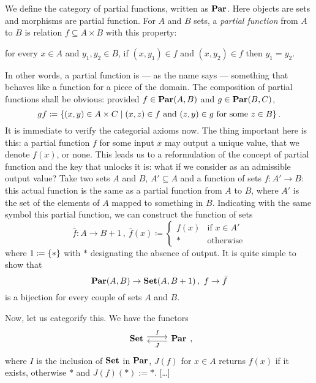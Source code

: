 \begin{example}
We define the category of partial functions, written as \(\mathbf{Par}\). Here objects are sets and morphisms are partial function. For \(A\) and \(B\) sets, a {\em partial function} from \(A\) to \(B\) is relation \(f \subseteq A \times B\) with this property:
\begin{center}
for every \(x \in A\) and \(y_1, y_2 \in B\), if \((x, y_1) \in f\) and \((x, y_2) \in f\) then \(y_1 = y_2\).
\end{center}
In other words, a partial function is --- as the name says --- something that behaves like a function for a piece of the domain. The composition of partial functions shall be obvious: provided \(f \in \mathbf{Par}(A, B)\) and \(g \in \mathbf{Par}(B, C)\),
\[gf \coloneq \left\{(x, y) \in A \times C \mid (x, z) \in f \text{ and } (z, y) \in g \text{ for some } z \in B\right\} .\]
It is immediate to verify the categorial axioms now.\newline
The thing important here is this: a partial function \(f\) for some input \(x\) may output a unique value, that we denote \(f(x)\), or none. This leads us to a reformulation of the concept of partial function and the key that unlocks it is: what if we consider  as an admissible output value? Take two sets \(A\) and \(B\), \(A' \subseteq A\) and a function of sets \(f : A' \to B\): this actual function is the same as a partial function from \(A\) to \(B\), where \(A'\) is the set of the elements of \(A\) mapped to something in \(B\). Indicating with the same symbol this partial function, we can construct the function of sets
\[\bar f : A \to B+1 \,, \ \bar f(x) \coloneq \begin{cases} f(x) & \text{if } x \in A' \\ \ast & \text{otherwise} \end{cases}\]
where \(1 \coloneq \left\{\ast\right\}\) with \(\ast\) designating the absence of output. It is quite simple to show that
\[\mathbf{Par}(A, B) \to \mathbf{Set}(A, B+1)\,,\ f \to \bar f\]
is a bijection for every couple of sets \(A\) and \(B\).

Now, let us categorify this. We have the functors
\[\begin{tikzcd}
\Set \ar["I", r, shift left] & \Par \ar["J", l, shift left]
\end{tikzcd},\]
where \(I\) is the inclusion of \(\mathbf{Set}\) in \(\mathbf{Par}\), \(J(f)\) for \(x \in A\) returns \(f(x)\) if it exists, otherwise \(\ast\) and \(J(f)(\ast) := \ast\). [\dots{}]
\end{example}


